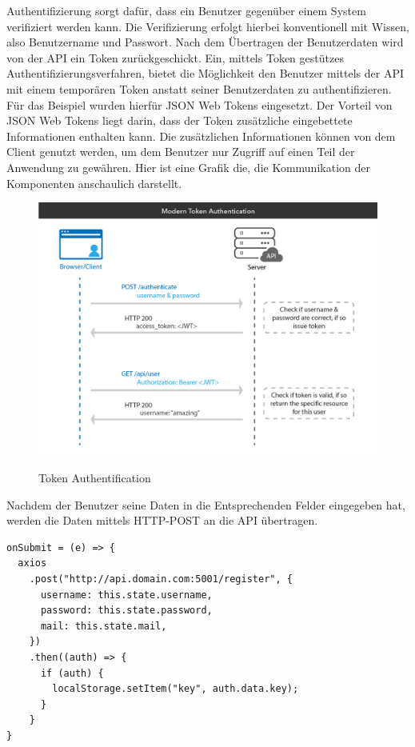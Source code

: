 \documentclass[utf8,biblatex]{lni}
\begin{document}
Authentifizierung sorgt dafür, dass ein Benutzer gegenüber einem System verifiziert werden kann.
Die Verifizierung erfolgt hierbei konventionell mit Wissen, also Benutzername und Passwort.
Nach dem Übertragen der Benutzerdaten wird von der API ein Token zurückgeschickt.
Ein, mittels Token gestützes Authentifizierungsverfahren, bietet die Möglichkeit den Benutzer mittels 
der API mit einem temporären Token anstatt seiner Benutzerdaten zu authentifizieren. 
Für das Beispiel wurden hierfür JSON Web Tokens \citet{o.V.2020} eingesetzt. 
Der Vorteil von JSON Web Tokens liegt darin, dass der Token zusätzliche eingebettete Informationen
enthalten kann. 
Die zusätzlichen Informationen können von dem Client genutzt werden, um dem Benutzer 
nur Zugriff auf einen Teil der Anwendung zu gewähren. 
Hier ist eine Grafik die, die Kommunikation der Komponenten anschaulich darstellt.
\newpage
\begin{figure}
  \centering
  \includegraphics[width=1\textwidth]{images/token-auth.png}
  \caption[Token Authentification]{Token Authentification} 
  \label{token-auth}
  \cite{Ngan.2019}
\end{figure} 

Nachdem der Benutzer seine Daten in die Entsprechenden Felder eingegeben hat, werden die Daten 
mittels HTTP-POST an die API übertragen.

\begin{verbatim}
onSubmit = (e) => {
  axios
    .post("http://api.domain.com:5001/register", {
      username: this.state.username,
      password: this.state.password,
      mail: this.state.mail,
    })
    .then((auth) => {
      if (auth) {
        localStorage.setItem("key", auth.data.key);
      }
    }
}
\end{verbatim}
\end{document}
